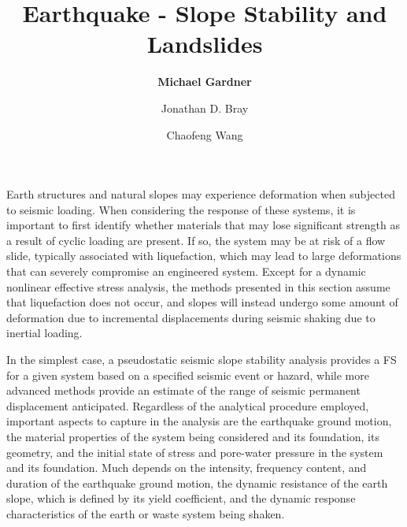 %
%
%


\title{Earthquake - Slope Stability and Landslides}
\author{
    \textbf{Michael Gardner} 
    \and Jonathan D. Bray
    \and Chaofeng Wang}
\tocauthor{}
%
%
\maketitle

Earth structures and natural slopes may experience deformation when subjected to seismic loading. When considering the response of these systems, it is important to first identify whether materials that may lose significant strength as a result of cyclic loading are present. If so, the system may be at risk of a flow slide, typically associated with liquefaction, which may lead to large deformations that can severely compromise an engineered system. Except for a dynamic nonlinear effective stress analysis, the methods presented in this section assume that liquefaction does not occur, and slopes will instead undergo some amount of deformation due to incremental displacements during seismic shaking due to inertial loading.

In the simplest case, a pseudostatic seismic slope stability analysis provides a FS for a given system based on a specified seismic event or hazard, while more advanced methods provide an estimate of the range of seismic permanent displacement anticipated. Regardless of the analytical procedure employed, important aspects to capture in the analysis are the earthquake ground motion, the material properties of the system being considered and its foundation, its geometry, and the initial state of stress and pore-water pressure in the system and its foundation. Much depends on the intensity, frequency content, and duration of the earthquake ground motion, the dynamic resistance of the earth slope, which is defined by its yield coefficient, and the dynamic response characteristics of the earth or waste system being shaken.

